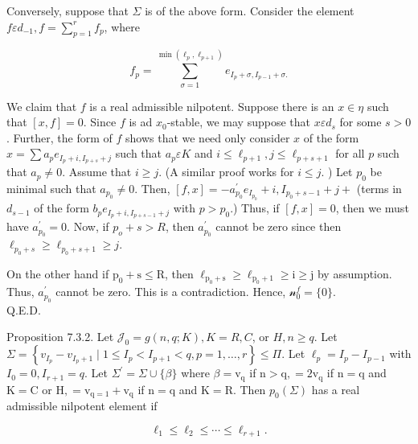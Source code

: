 \documentclass[10pt]{article}
\begin{document}
Conversely, suppose that $\Sigma$ is of the above form. Consider the element $f \varepsilon d_{-1}, f=\sum_{p=1}^{r} f_{p}$, where


\begin{equation*}
f_{p}=\sum_{\sigma=1}^{\min \left(\ell_{p}, \ell_{p+1}\right)} e_{I_{p}+\sigma, I_{p-1}+\sigma .} \tag{7.3.2}
\end{equation*}


We claim that $f$ is a real admissible nilpotent. Suppose there is an $x \in \eta$ such that $[x, f]=0$. Since $f$ is ad $x_{0}$-stable, we may suppose that $x \varepsilon d_{s}$ for some $s>0$. Further, the form of $f$ shows that we need only consider $x$ of the form $x=\sum a_{p} e_{I_{p}+i, I_{p+s}+j}$ such that $a_{p} \varepsilon K$ and $i \leq \ell_{p+1}, j \leq \ell_{p+s+1}$ for all $p$ such that $a_{p} \neq 0$. Assume that $i \geq j$. (A similar proof works for $i \leq j$. ) Let $p_{0}$ be minimal such that $a_{p_{0}} \neq 0$. Then, $[f, x]=-a_{p_{0}}^{\prime} e_{I_{p_{0}}}+i, I_{p_{0}+s-1}+j+$ (terms in $d_{s-1}$ of the form $b_{p} e_{I_{p}+i, I_{p+s-1}+j}$ with $p>p_{0}$.) Thus, if $[f, x]=0$, then we must have $a_{p_{0}}^{\prime}=0$. Now, if $p_{o}+s>R$, then $a_{p_{0}}^{\prime}$ cannot be zero since then $\ell_{p_{0}+s} \geq \ell_{p_{0}+s+1} \geq j$.

On the other hand if $\mathrm{p}_{0}+\mathrm{s} \leq \mathrm{R}$, then $\ell_{\mathrm{p}_{0}+\mathrm{s}} \geq \ell_{\mathrm{p}_{0}+1} \geq \mathrm{i} \geq \mathrm{j}$ by assumption. Thus, $a_{p_{0}}^{\prime}$ cannot be zero. This is a contradiction. Hence, $\mathcal{n}_{0}^{f}=\{0\}$.\\
Q.E.D.

Proposition 7.3.2. Let $\mathcal{J}_{0}=g(n, q ; K), K=R, C$, or $H, n \geq q$. Let $\Sigma=\left\{v_{I_{p}}-v_{I_{p}+1} \mid 1 \leq I_{p}<I_{p+1}<q, p=1, \ldots, r\right\} \leq \Pi$. Let $\ell_{p}=I_{p}-I_{p-1}$ with $I_{0}=0, I_{r+1}=q$. Let $\Sigma^{\prime}=\Sigma \cup\{\beta\}$ where $\beta=\mathrm{v}_{\mathrm{q}}$ if $\mathrm{n}>\mathrm{q},=2 \mathrm{v}_{\mathrm{q}}$ if $\mathrm{n}=\mathrm{q}$ and $\mathrm{K}=\mathrm{C}$ or $\mathrm{H},=\mathrm{v}_{\mathrm{q}=1}+\mathrm{v}_{\mathrm{q}}$ if $\mathrm{n}=\mathrm{q}$ and $\mathrm{K}=\mathrm{R}$. Then $p_{0}(\Sigma)$ has a real admissible nilpotent element if


\begin{equation*}
\ell_{1} \leq \ell_{2} \leq \cdots \leq \ell_{r+1} . \tag{7.3.3}
\end{equation*}
\end{document}
